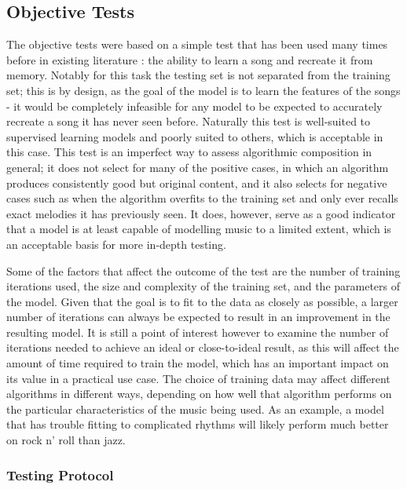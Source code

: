 \documentclass[ author={Stephen Livermore-Tozer},
				supervisor={Dr. Peter Flach},
				degree={MEng},
				title={Algorithmic Co-composition Using Machine Learning},
				subtitle={},
				type={research},
				year={2016} ]{dissertation}
\begin{document}
	\subsection{Objective Tests}
	\label{sec:objective-analysis}
	
	The objective tests were based on a simple test that has been used many times before in existing literature \cite{todd1989connectionist,franklin2006recurrent,paiement2007generative}: the ability to learn a song and recreate it from memory. Notably for this task the testing set is not separated from the training set; this is by design, as the goal of the model is to learn the features of the songs - it would be completely infeasible for any model to be expected to accurately recreate a song it has never seen before. Naturally this test is well-suited to supervised learning models and poorly suited to others, which is acceptable in this case. This test is an imperfect way to assess algorithmic composition in general; it does not select for many of the positive cases, in which an algorithm produces consistently good but original content, and it also selects for negative cases such as when the algorithm overfits to the training set and only ever recalls exact melodies it has previously seen. It does, however, serve as a good indicator that a model is at least capable of modelling music to a limited extent, which is an acceptable basis for more in-depth testing.
	
	Some of the factors that affect the outcome of the test are the number of training iterations used, the size and complexity of the training set, and the parameters of the model. Given that the goal is to fit to the data as closely as possible, a larger number of iterations can always be expected to result in an improvement in the resulting model. It is still a point of interest however to examine the number of iterations needed to achieve an ideal or close-to-ideal result, as this will affect the amount of time required to train the model, which has an important impact on its value in a practical use case. The choice of training data may affect different algorithms in different ways, depending on how well that algorithm performs on the particular characteristics of the music being used. As an example, a model that has trouble fitting to complicated rhythms will likely perform much better on rock n' roll than jazz. 
	
	\subsubsection{Testing Protocol}
	
\end{document}

